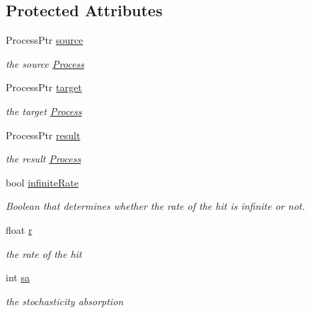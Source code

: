 \subsection*{\-Protected \-Attributes}
\begin{DoxyCompactItemize}
\item 
\hypertarget{class_action_a3c09a49605fcc2f51ee6eb792f7bb9b4}{\-Process\-Ptr \hyperlink{class_action_a3c09a49605fcc2f51ee6eb792f7bb9b4}{source}}\label{class_action_a3c09a49605fcc2f51ee6eb792f7bb9b4}

\begin{DoxyCompactList}\small\item\em the source \hyperlink{class_process}{\-Process} \end{DoxyCompactList}\item 
\hypertarget{class_action_ac77168b4d172cfc7238cfbb422fa4a98}{\-Process\-Ptr \hyperlink{class_action_ac77168b4d172cfc7238cfbb422fa4a98}{target}}\label{class_action_ac77168b4d172cfc7238cfbb422fa4a98}

\begin{DoxyCompactList}\small\item\em the target \hyperlink{class_process}{\-Process} \end{DoxyCompactList}\item 
\hypertarget{class_action_a5896c6900916d296ed4220063f24b78d}{\-Process\-Ptr \hyperlink{class_action_a5896c6900916d296ed4220063f24b78d}{result}}\label{class_action_a5896c6900916d296ed4220063f24b78d}

\begin{DoxyCompactList}\small\item\em the result \hyperlink{class_process}{\-Process} \end{DoxyCompactList}\item 
\hypertarget{class_action_a5107742916f82d9f529f17606ad5ab74}{bool \hyperlink{class_action_a5107742916f82d9f529f17606ad5ab74}{infinite\-Rate}}\label{class_action_a5107742916f82d9f529f17606ad5ab74}

\begin{DoxyCompactList}\small\item\em \-Boolean that determines whether the rate of the hit is infinite or not. \end{DoxyCompactList}\item 
\hypertarget{class_action_a87bdc737d9edb523ec57adb27adec6b6}{float \hyperlink{class_action_a87bdc737d9edb523ec57adb27adec6b6}{r}}\label{class_action_a87bdc737d9edb523ec57adb27adec6b6}

\begin{DoxyCompactList}\small\item\em the rate of the hit \end{DoxyCompactList}\item 
\hypertarget{class_action_a5832a567f356f72e4767d84ad6a6212a}{int \hyperlink{class_action_a5832a567f356f72e4767d84ad6a6212a}{sa}}\label{class_action_a5832a567f356f72e4767d84ad6a6212a}

\begin{DoxyCompactList}\small\item\em the stochasticity absorption \end{DoxyCompactList}\end{DoxyCompactItemize}


